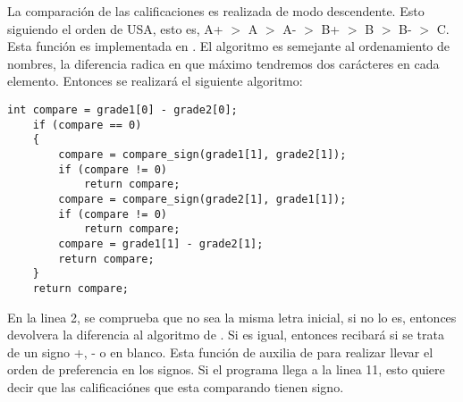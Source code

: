 La comparación de las calificaciones es realizada de modo descendente. Esto siguiendo el orden de USA, esto es, A+ $>$ A $>$ A- $>$ B+ $>$ B $>$ B- $>$ C. Esta función es implementada en . El algoritmo es semejante al ordenamiento de nombres, la diferencia radica en que máximo tendremos dos carácteres en cada elemento. Entonces se realizará el siguiente algoritmo:

\begin{lstlisting}[style=CStyle]
    int compare = grade1[0] - grade2[0];
    if (compare == 0)
    {
        compare = compare_sign(grade1[1], grade2[1]);
        if (compare != 0)
            return compare;
        compare = compare_sign(grade2[1], grade1[1]);
        if (compare != 0)
            return compare;
        compare = grade1[1] - grade2[1];
        return compare;
    }
    return compare;
\end{lstlisting}

En la linea 2, se comprueba que no sea la misma letra inicial, si no lo es, entonces devolvera la diferencia al algoritmo de . Si es igual, entonces recibará si se trata de un signo +, - o en blanco. Esta función de auxilia de  para realizar llevar el orden de preferencia en los signos. Si el programa llega a la linea 11, esto quiere decir que las calificaciónes que esta comparando tienen signo.